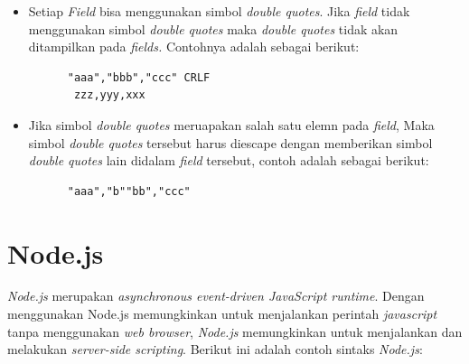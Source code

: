 \begin{itemize}
    \item Setiap \textit{Field} bisa menggunakan simbol \textit{double quotes}. Jika \textit{field} tidak menggunakan simbol \textit{double quotes} maka \textit{double quotes} tidak akan ditampilkan pada \textit{fields.} Contohnya adalah sebagai berikut: 
    \begin{lstlisting}
      "aaa","bbb","ccc" CRLF
       zzz,yyy,xxx
    \end{lstlisting}
    
    \item Jika simbol \textit{double quotes} meruapakan salah satu elemn pada \textit{field}, Maka simbol \textit{double quotes} tersebut harus diescape dengan memberikan simbol \textit{double quotes} lain didalam \textit{field} tersebut, contoh adalah sebagai berikut:
    \begin{lstlisting}
      "aaa","b""bb","ccc"
    \end{lstlisting}
\end{itemize}















\section{Node.js}
\label{sec:nodejs}
\textit{Node.js} merupakan \textit{asynchronous event-driven JavaScript runtime}. Dengan menggunakan Node.js memungkinkan untuk menjalankan perintah \textit{javascript} tanpa menggunakan \textit{web browser}, \textit{Node.js} memungkinkan untuk menjalankan dan melakukan \textit{server-side scripting}\cite{Nodejs:01:about}. Berikut ini adalah contoh sintaks \textit{Node.js}:

